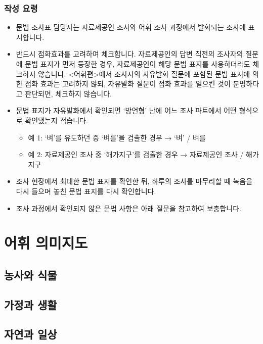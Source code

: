 \documentclass{snu-fl-questionnaire}
\begin{document}
\subsection{작성 요령}
\begin{itemize}[noitemsep]
  \item 문법 조사표 담당자는 자료제공인 조사와 어휘 조사 과정에서 발화되는 조사에 표시합니다.
  \item 반드시 점화효과를 고려하여 체크합니다. 자료제공인의 답변 직전의 조사자의 질문에 문법 표지가 먼저 등장한 경우, 자료제공인이 해당 문법 표지를 사용하더라도 체크하지 않습니다. <어휘편>에서 조사자의 자유발화 질문에 포함된 문법 표지에 의한 점화 효과는 고려하지 않되, 자유발화 질문이 점화 효과를 일으킨 것이 분명하다고 판단되면, 체크하지 않습니다. 
  \item 문법 표지가 자유발화에서 확인되면 `방언형' 난에 어느 조사 파트에서 어떤 형식으로 확인됐는지 적습니다.
    \begin{itemize}[noitemsep]
      \item 예 1: `벼'를 유도하던 중 `벼를'을 검출한 경우 → `벼' / 벼를
      \item 예 2: 자료제공인 조사 중 `해가지구'를 검출한 경우 → 자료제공인 조사 / 해가지구
    \end{itemize}
  \item 조사 현장에서 최대한 문법 표지를 확인한 뒤, 하루의 조사를 마무리할 때 녹음을 다시 들으며 놓친 문법 표지를 다시 확인합니다.
  \item 조사 과정에서 확인되지 않은 문법 사항은 아래 질문을 참고하여 보충합니다.
\end{itemize}




\chapter{어휘 의미지도}
\section{농사와 식물}

\section{가정과 생활}

\section{자연과 일상}
\end{document}

